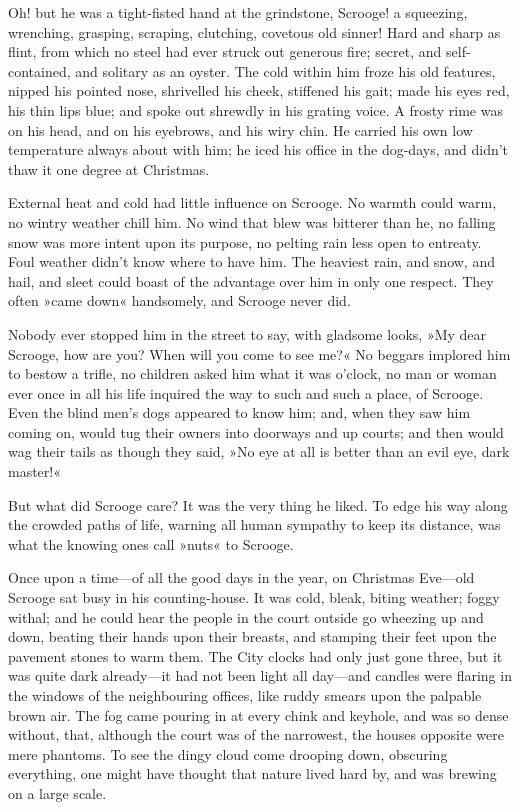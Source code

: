 Oh! but he was a tight-fisted hand at the grindstone, Scrooge! a squeezing, wrenching, grasping, scraping, clutching, covetous old sinner! Hard and sharp as flint, from which no steel had ever struck out generous fire; secret, and self-contained, and solitary as an oyster. The cold within him froze his old features, nipped his pointed nose, shrivelled his cheek, stiffened his gait; made his eyes red, his thin lips blue; and spoke out shrewdly in his grating voice. A frosty rime was on his head, and on his eyebrows, and his wiry chin. He carried his own low temperature always about with him; he iced his office in the dog-days, and didn't thaw it one degree at Christmas.

External heat and cold had little influence on Scrooge. No  warmth could warm, no wintry weather chill him. No wind that blew was bitterer than he, no falling snow was more intent upon its purpose, no pelting rain less open to entreaty. Foul weather didn't know where to have him. The heaviest rain, and snow, and hail, and sleet could boast of the advantage over him in only one respect. They often »came down« handsomely, and Scrooge never did.

Nobody ever stopped him in the street to say, with gladsome looks, »My dear Scrooge, how are you? When will you come to see me?« No beggars implored him to bestow a trifle, no children asked him what it was o'clock, no man or woman ever once in all his life inquired the way to such and such a place, of Scrooge. Even the blind men's dogs appeared to know him; and, when they saw him coming on, would tug their owners into doorways and up courts; and then would wag their tails as though they said, »No eye at all is better than an evil eye, dark master!«

But what did Scrooge care? It was the very thing he liked. To edge his way along the crowded paths of life, warning all human sympathy to keep its distance, was what the knowing ones call »nuts« to Scrooge.

Once upon a time---of all the good days in the year, on Christmas Eve---old Scrooge sat busy in his counting-house. It was cold, bleak, biting weather; foggy withal; and he could hear the people in the court outside go wheezing up and down, beating their hands upon their breasts, and stamping their feet upon the pavement stones to warm them. The City clocks had only just gone three, but it was quite dark already---it had not been light all day---and candles were flaring in the windows of the neighbouring offices, like ruddy smears upon the palpable brown air. The fog came pouring in at every chink and keyhole, and was so dense without, that, although the court was of the narrowest, the houses opposite were mere phantoms. To see the dingy cloud come drooping down, obscuring everything, one might have thought that nature lived hard by, and was brewing on a large scale.

